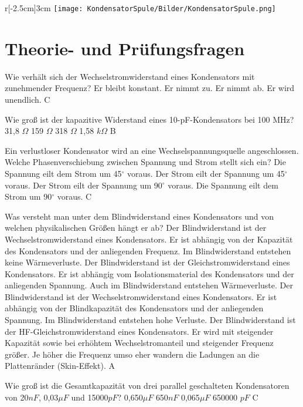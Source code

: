 \begin{wrapfigure}[0]{r}[-2.5cm]{3cm}
 \vspace{-6cm}
 \texttt{[image: KondensatorSpule/Bilder/KondensatorSpule.png]}
 \vspace{-6cm}
\end{wrapfigure}

\section*{Theorie- und Prüfungsfragen} 


{Wie verhält sich der Wechselstromwiderstand eines Kondensators mit zunehmender Frequenz?}%
{Er bleibt konstant.}%
{Er nimmt zu.}%
{Er nimmt ab.}%
{Er wird unendlich.}%
{C}%

{Wie groß ist der kapazitive Widerstand eines 10-pF-Kondensators bei 100 MHz?}%
{31,8 $\Omega$}%
{159 $\Omega$}%
{318 $\Omega$}%
{1,58 $k\Omega$}%
{B}%

{Ein verlustloser Kondensator wird an eine Wechselspannungsquelle angeschlossen. Welche Phasenverschiebung zwischen Spannung und Strom stellt sich ein?}%
{Die Spannung eilt dem Strom um 45$^\circ$ voraus.}%
{Der Strom eilt der Spannung um 45$^\circ$ voraus.}%
{Der Strom eilt der Spannung um 90$^\circ$ voraus.}%
{Die Spannung eilt dem Strom um 90$^\circ$ voraus.
}%
{C}%

{Was versteht man unter dem Blindwiderstand eines Kondensators und von welchen physikalischen Größen hängt er ab?}%
{Der Blindwiderstand ist der Wechselstromwiderstand eines Kondensators. Er ist abhängig von der Kapazität des Kondensators und der anliegenden Frequenz. Im Blindwiderstand entstehen keine Wärmeverluste.}%
{Der Blindwiderstand ist der Gleichstromwiderstand eines Kondensators. Er ist abhängig vom Isolationsmaterial des Kondensators und der anliegenden Spannung. Auch im Blindwiderstand entstehen Wärmeverluste.}%
{Der Blindwiderstand ist der Wechselstromwiderstand eines Kondensators. Er ist abhängig von der Blindkapazität des Kondensators und der anliegenden Spannung. Im Blindwiderstand entstehen hohe Verluste.}%
{Der Blindwiderstand ist der HF-Gleichstromwiderstand eines Kondensators. Er wird mit steigender Kapazität sowie bei erhöhtem Wechselstromanteil und steigender Frequenz größer. Je höher die Frequenz umso eher wandern die Ladungen an die Plattenränder (Skin-Effekt).}%
{A}%

{Wie groß ist die Gesamtkapazität von drei parallel geschalteten Kondensatoren von 20$nF$, 0,03$\mu F$ und 15000$pF$?}%
{0,650$\mu F$}%
{650$nF$}%
{0,065$\mu F$}%
{650000 $pF$
}%
{C}%

